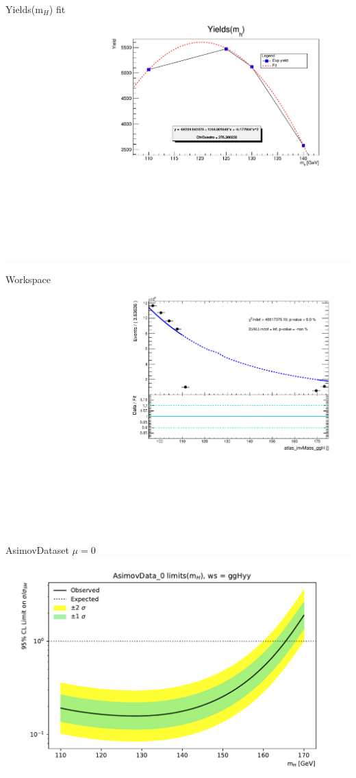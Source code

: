 \documentclass[10pt,UKenglish, leqno, xcolor = dvipsnames]{beamer}
\begin{document}
		\begin{frame}{Yields(m$_H$) fit}
			\vfill
			\includegraphics[width=1.\textwidth]{../images/yields_fit.pdf}
			\vfill
		\end{frame}
	
		\begin{frame}{Workspace}
			\vfill
			\includegraphics[width=1.\textwidth]{../images/ggHyy_rebin10.pdf}
			\vfill
		\end{frame}
	
		\begin{frame}{AsimovDataset $\mu=0$}
			\vfill
			\includegraphics[width=1.\textwidth]{../images/plot_AsimovData_0_ggHyy.pdf}
			\vfill
		\end{frame}
	
\end{document}
